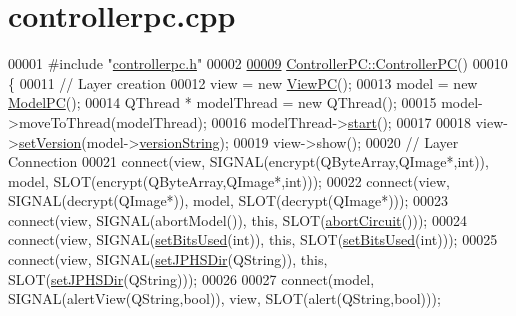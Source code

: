 \hypertarget{controllerpc_8cpp_source}{}\section{controllerpc.\+cpp}
\label{controllerpc_8cpp_source}

\begin{DoxyCode}
00001 \textcolor{preprocessor}{#include "\mbox{\hyperlink{controllerpc_8h}{controllerpc.h}}"}
00002 
\mbox{\hyperlink{class_controller_p_c_afa6c92d67bf3b6531c42385fc5938003}{00009}} \mbox{\hyperlink{class_controller_p_c_afa6c92d67bf3b6531c42385fc5938003}{ControllerPC::ControllerPC}}()
00010 \{
00011     \textcolor{comment}{// Layer creation}
00012     view = \textcolor{keyword}{new} \mbox{\hyperlink{class_view_p_c}{ViewPC}}();
00013     model = \textcolor{keyword}{new} \mbox{\hyperlink{class_model_p_c}{ModelPC}}();
00014     QThread * modelThread = \textcolor{keyword}{new} QThread();
00015     model->moveToThread(modelThread);
00016     modelThread->\mbox{\hyperlink{class_model_p_c_a3cae34fd5bcb06e8c1f8cfe7961bd270}{start}}();
00017 
00018     view->\mbox{\hyperlink{class_view_p_c_ac05220df875b7c4f24405a5742476ebf}{setVersion}}(model->\mbox{\hyperlink{class_model_p_c_a5f426725ccf7eefd3c77ea8c720264c9}{versionString}});
00019     view->show();
00020     \textcolor{comment}{// Layer Connection}
00021     connect(view, SIGNAL(encrypt(QByteArray,QImage*,\textcolor{keywordtype}{int})), model, SLOT(encrypt(QByteArray,QImage*,\textcolor{keywordtype}{int})));
00022     connect(view, SIGNAL(decrypt(QImage*)), model, SLOT(decrypt(QImage*)));
00023     connect(view, SIGNAL(abortModel()), \textcolor{keyword}{this}, SLOT(\mbox{\hyperlink{class_controller_p_c_a8814989f7be1214e06b2e720889066b0}{abortCircuit}}()));
00024     connect(view, SIGNAL(\mbox{\hyperlink{class_controller_p_c_afd8d33ed84e463c5e0ce6715067003f3}{setBitsUsed}}(\textcolor{keywordtype}{int})), \textcolor{keyword}{this}, SLOT(\mbox{\hyperlink{class_controller_p_c_afd8d33ed84e463c5e0ce6715067003f3}{setBitsUsed}}(\textcolor{keywordtype}{int})));
00025     connect(view, SIGNAL(\mbox{\hyperlink{class_controller_p_c_ac00d29685a7e5b780c01eb438e10f96d}{setJPHSDir}}(QString)), \textcolor{keyword}{this}, SLOT(\mbox{\hyperlink{class_controller_p_c_ac00d29685a7e5b780c01eb438e10f96d}{setJPHSDir}}(QString)));
00026 
00027     connect(model, SIGNAL(alertView(QString,\textcolor{keywordtype}{bool})), view, SLOT(alert(QString,\textcolor{keywordtype}{bool})));

\end{DoxyCode}
